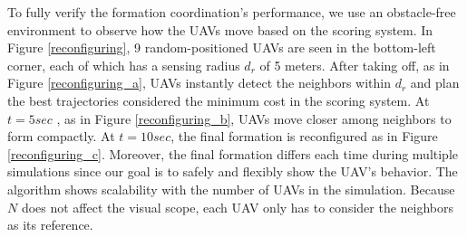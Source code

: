 To fully verify the formation coordination's performance, we use an obstacle-free environment to observe how the UAVs move based on the scoring system. In Figure \ref{reconfiguring}, 9 random-positioned UAVs are seen in the bottom-left corner, each of which has a sensing radius $d_{r}$ of 5 meters. After taking off, as in Figure \ref{reconfiguring_a}, UAVs instantly detect the neighbors within $d_{r}$ and plan the best trajectories considered the minimum cost in the scoring system. At $t= 5 sec$ , as in Figure \ref{reconfiguring_b}, UAVs move closer among neighbors to form compactly. At $t= 10 sec$, the final formation is reconfigured as in Figure \ref{reconfiguring_c}. Moreover, the final formation differs each time during multiple simulations since our goal is to safely and flexibly show the UAV's behavior. The algorithm shows scalability with the number of UAVs in the simulation. Because $N$ does not affect the visual scope, each UAV only has to consider the neighbors as its reference. 

